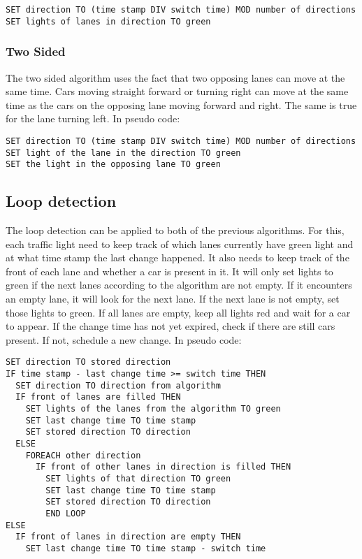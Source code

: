 \documentclass[a4paper,11pt]{article}
\begin{document}
\begin{lstlisting}
SET direction TO (time stamp DIV switch time) MOD number of directions
SET lights of lanes in direction TO green
\end{lstlisting}


\subsubsection*{Two Sided}
The two sided algorithm uses the fact that two opposing lanes can move at the same time.
Cars moving straight forward or turning right can move at the same time as the cars on the
opposing lane moving forward and right. The same is true for the lane turning left.
In pseudo code:

\begin{lstlisting}
SET direction TO (time stamp DIV switch time) MOD number of directions
SET light of the lane in the direction TO green
SET the light in the opposing lane TO green
\end{lstlisting}

\subsection*{Loop detection}
The loop detection can be applied to both of the previous algorithms.
For this, each traffic light need to keep track of which lanes currently have green light
and at what time stamp the last change happened.
It also needs to keep track of the front of each lane and whether a car is present in it.
It will only set lights to green if the next lanes according to the algorithm are not empty.
If it encounters an empty lane, it will look for the next lane.
If the next lane is not empty, set those lights to green.
If all lanes are empty, keep all lights red and wait for a car to appear.
If the change time has not yet expired, check if there are still cars present.
If not, schedule a new change.
In pseudo code:

\begin{lstlisting}
SET direction TO stored direction
IF time stamp - last change time >= switch time THEN
  SET direction TO direction from algorithm
  IF front of lanes are filled THEN
    SET lights of the lanes from the algorithm TO green
    SET last change time TO time stamp
    SET stored direction TO direction
  ELSE
    FOREACH other direction
      IF front of other lanes in direction is filled THEN
        SET lights of that direction TO green
        SET last change time TO time stamp
        SET stored direction TO direction
        END LOOP
ELSE
  IF front of lanes in direction are empty THEN
    SET last change time TO time stamp - switch time

  
	
  
\end{lstlisting}
\end{document}
